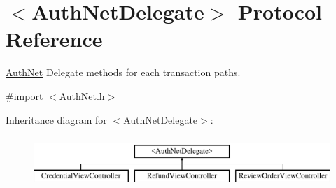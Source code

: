 \hypertarget{protocol_auth_net_delegate-p}{
\section{$<$AuthNetDelegate$>$ Protocol Reference}
\label{protocol_auth_net_delegate-p}
}


\hyperlink{interface_auth_net}{AuthNet} Delegate methods for each transaction paths.  




{\ttfamily \#import $<$AuthNet.h$>$}

Inheritance diagram for $<$AuthNetDelegate$>$:\begin{figure}[H]
\begin{center}
\leavevmode
\includegraphics[height=2.000000cm]{protocol_auth_net_delegate-p}
\end{center}
\end{figure}
